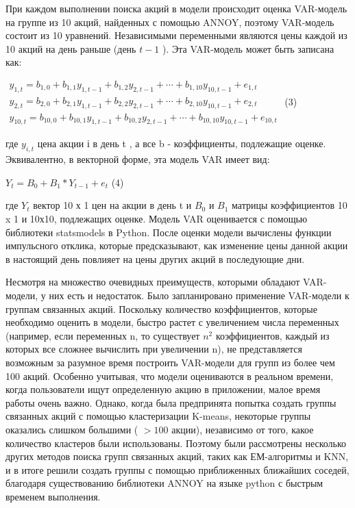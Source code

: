\documentclass[
]{article}
\begin{document}
При каждом выполнении поиска акций в модели происходит оценка VAR-модель
на группе из 10 акций, найденных с помощью ANNOY, поэтому VAR-модель
состоит из 10 уравнений. Независимыми переменными являются цены каждой
из 10 акций на день раньше (день \(t - 1\) ). Эта VAR-модель может быть
записана как:

\(\begin{matrix}
y_{1,t} = b_{1,0} + b_{1,1}y_{1,t - 1} + b_{1,2}y_{2,t - 1} + \cdots + b_{1,10}y_{10,t - 1} + e_{1,t} \\
y_{2,t} = b_{2,0} + b_{2,1}y_{1,t - 1} + b_{2,2}y_{2,t - 1} + \cdots + b_{2,10}y_{10,t - 1} + e_{2,t} \\
y_{10,t} = b_{10,0} + b_{10,1}y_{1,t - 1} + b_{10,2}y_{2,t - 1} + \cdots + b_{10,10}y_{10,t - 1} + e_{10,t}
\end{matrix}\) (3)

где \(y_{i,t}\) цена акции і в день t , а все b - коэффициенты,
подлежащие оценке. Эквивалентно, в векторной форме, эта модель VAR имеет
вид:

\(Y_{t} = B_{0} + B_{1}*Y_{t - 1} + e_{t}\) (4)

где \(Y_{t}\) вектор 10 х 1 цен на акции в день t и \(B_{0}\) и
\(B_{1}\) матрицы коэффициентов 10 x 1 и 10х10, подлежащих оценке.
Модель VAR оценивается с помощью библиотеки statsmodels в Python. После
оценки модели вычислены функции импульсного отклика, которые
предсказывают, как изменение цены данной акции в настоящий день повлияет
на цены других акций в последующие дни.

Несмотря на множество очевидных преимуществ, которыми обладают
VAR-модели, у них есть и недостаток. Было запланировано применение
VAR-модели к группам связанных акций. Поскольку количество
коэффициентов, которые необходимо оценить в модели, быстро растет с
увеличением числа переменных (например, если переменных n, то существует
\(n^{2}\) коэффициентов, каждый из которых все сложнее вычислить при
увеличении n), не представляется возможным за разумное время построить
VAR-модели для групп из более чем 100 акций. Особенно учитывая, что
модели оцениваются в реальном времени, когда пользователи ищут
определенную акцию в приложении, малое время работы очень важно. Однако,
когда была предпринята попытка создать группы связанных акций с помощью
кластеризации K-means, некоторые группы оказались слишком большими (
\(> 100\) акции), независимо от того, какое количество кластеров были
использованы. Поэтому были рассмотрены несколько других методов поиска
групп связанных акций, таких как ЕМ-алгоритмы и KNN, и в итоге решили
создать группы с помощью приближенных ближайших соседей, благодаря
существованию библиотеки ANNOY на языке python с быстрым временем
выполнения.
\end{document}
